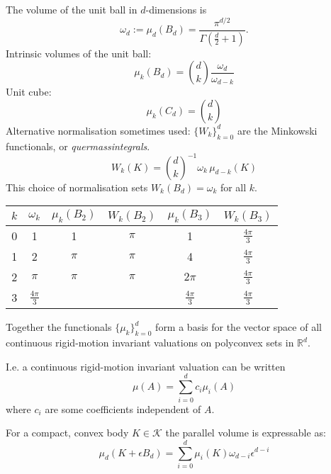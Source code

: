 The volume of the unit ball in $d$-dimensions is
\begin{equation}
  \omega_d := \mu_d(B_d) = \frac{\pi^{d/2}}{\Gamma(\frac{d}{2} + 1)}.
\end{equation}
Intrinsic volumes of the unit ball:
\begin{equation}\label{eq:intrinsic-volume-ball}
  \mu_k (B_d) = {d \choose k} \frac{\omega_d}{\omega_{d-k}}
\end{equation}
Unit cube:
\begin{equation}
  \mu_k (C_d) = {d \choose k}
\end{equation}
Alternative normalisation sometimes used: $\{W_k\}_{k=0}^d$ are the Minkowski functionals, or \emph{quermassintegrals}.
\begin{equation}
  W_k(K) = {d \choose k}^{-1} \omega_k \, \mu_{d-k}(K)
\end{equation}
This choice of normalisation sets $W_k(B_d) = \omega_k$ for all $k$.

\begin{center}
\begin{tabular}{cccccc}
  \toprule
  $k$ & $\omega_k$ & $\mu_k(B_2)$ & $W_k(B_2)$ & $\mu_k(B_3)$ & $W_k(B_3)$ \\
  \midrule
  0 & 1 & 1 & $\pi$ & 1 & $\frac{4\pi}{3}$ \\
  1 & 2 & $\pi$ & $\pi$ & 4 & $\frac{4\pi}{3}$ \\
  2 & $\pi$ & $\pi$ & $\pi$ & $2\pi$ & $\frac{4\pi}{3}$ \\
  3 & $\frac{4\pi}{3}$ &&& $\frac{4\pi}{3}$ & $\frac{4\pi}{3}$ \\
  \bottomrule
\end{tabular}
\end{center}

\begin{theorem}
  Together the functionals $\{\mu_k\}_{k=0}^d$ form a basis for the vector space of all continuous rigid-motion invariant valuations on polyconvex sets in $\mathbb{R}^d$.
\end{theorem}

I.e. a continuous rigid-motion invariant valuation can be written
\begin{equation}
  \mu(A) = \sum_{i=0}^d c_i \mu_i(A)
\end{equation}
where $c_i$ are some coefficients independent of $A$.

\begin{theorem}
  For a compact, convex body $K \in \mathcal{K}$ the parallel volume is expressable as:
  \begin{equation}
    \mu_d(K + \epsilon B_d) =
    \sum_{i=0}^d \mu_i(K) \omega_{d-i} \epsilon^{d-i}
  \end{equation}
\end{theorem}

